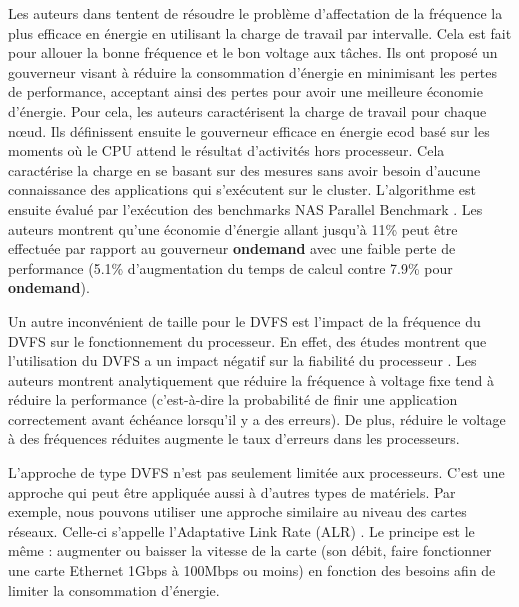 \begin{onehalfspace}
Les auteurs dans \cite{ref12} tentent de résoudre  le  problème d’affectation de la fréquence la plus efficace en énergie en utilisant la charge de travail par intervalle. Cela est fait pour allouer la bonne fréquence et le bon voltage aux tâches. Ils ont proposé  un gouverneur visant à réduire la consommation d’énergie en minimisant les pertes de performance, acceptant ainsi des pertes pour avoir une  meilleure économie d’énergie. Pour cela, les auteurs caractérisent la charge de travail pour chaque nœud. Ils définissent ensuite le gouverneur efficace en énergie ecod basé sur les moments où le CPU attend le résultat d’activités hors processeur. Cela caractérise la charge en se basant sur des mesures sans avoir besoin d’aucune connaissance des applications qui s’exécutent sur le cluster. L’algorithme est ensuite évalué par l’exécution des benchmarks NAS Parallel Benchmark \cite{ref13}. Les auteurs montrent qu’une économie d’énergie allant jusqu’à 11\% peut être effectuée par rapport au gouverneur \textbf{ondemand} avec une faible perte de performance (5.1\% d’augmentation du temps de calcul contre 7.9\% pour \textbf{ondemand}).\medskip 


Un autre inconvénient de taille pour le DVFS est l'impact de la fréquence du DVFS sur le fonctionnement du processeur. En effet, des études montrent que l'utilisation du DVFS a un impact négatif sur la fiabilité du processeur \cite{ref14}. Les auteurs montrent analytiquement que réduire la fréquence à voltage fixe tend à réduire la performance (c'est-à-dire la probabilité de finir une application correctement avant échéance lorsqu'il y a des erreurs). De plus, réduire le voltage à des fréquences réduites augmente le taux d'erreurs dans les processeurs. \medskip 

L'approche de type DVFS n'est pas seulement limitée aux processeurs. C'est une approche qui peut être appliquée aussi à d'autres types de matériels. Par exemple, nous pouvons utiliser une approche similaire au niveau des cartes réseaux. Celle-ci s'appelle l'Adaptative Link Rate (ALR) \cite{ref15}. Le principe est le même : augmenter ou baisser la vitesse de la carte (son débit, faire fonctionner une carte Ethernet 1Gbps à 100Mbps ou moins) en fonction des besoins afin de limiter la consommation d'énergie. %


\end{onehalfspace}
